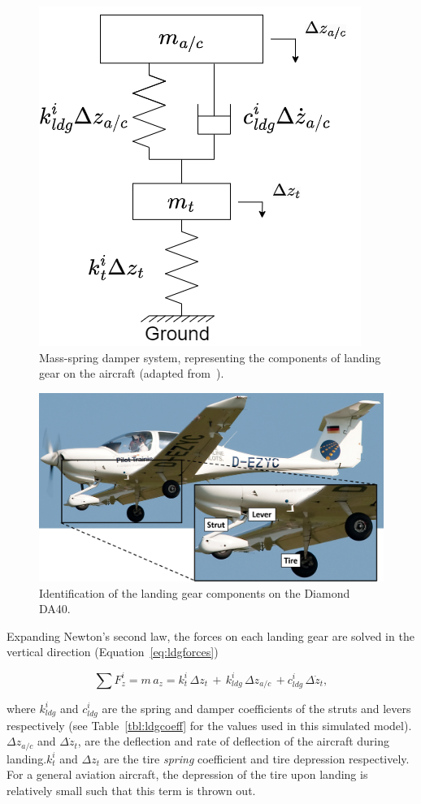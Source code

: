 \begin{figure}[!ht]\label{fig:ldgfbd}
    \centering
    \includegraphics[width=.4\linewidth]{Figures/ldgfbd.drawio.png}
    \caption{Mass-spring damper system, representing the components of landing gear on the aircraft (adapted from~\cite{xingStrengthAnalysisDiagonal2012}).}
\end{figure}

\begin{figure}[!ht]\label{fig:ldg}
    \centering
    \includegraphics[width=.75\linewidth]{Figures/LandingGear.png}
    \caption{Identification of the landing gear components on the Diamond DA40.}
\end{figure}

Expanding Newton's second law, the forces on each landing gear are solved in the vertical direction (Equation~\ref{eq:ldgforces})

\begin{equation}
    \sum F^i_z = m\,a_z = k^i_t\, \Delta z_t\, + \, k^i_{ldg}\, \Delta z_{a/c}\, + c^i_{ldg}\, \Delta \dot{z}_t,
    \label{eq:ldgforces}
\end{equation}

where \(k^i_{ldg}\) and \(c^i_{ldg}\) are the spring and damper coefficients of the struts and levers respectively (see Table~\ref{tbl:ldgcoeff} for the values used in this simulated model). \(\Delta z_{a/c}\) and \(\Delta \dot{z}_t\), are the deflection and rate of deflection of the aircraft during landing.\( k^i_t \) and \(\Delta z_t\) are the tire \textit{spring} coefficient and tire depression respectively. For a general aviation aircraft, the depression of the tire upon landing is relatively small such that this term is thrown out.

